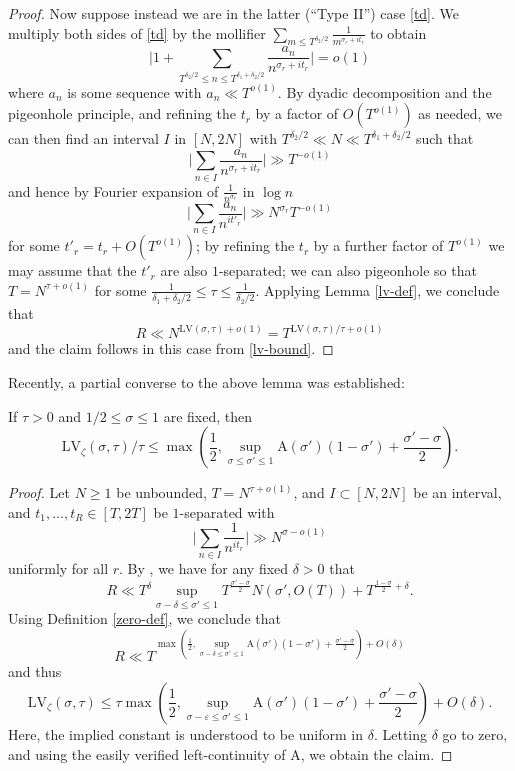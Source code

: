 \documentclass[a4paper, 10pt]{amsart}
\newcommand{\eps}{\varepsilon}
\newcommand{\LV}{\mathrm{LV}}
\newcommand{\A}{\mathrm{A}}
\begin{document}
\begin{proof}
    Now suppose instead we are in the latter (``Type II'') case \eqref{td}.  We multiply both sides of \eqref{td} by the mollifier $\sum_{m \leq T^{\delta_2/2}} \frac{1}{m^{\sigma_r+it_r}}$ to obtain
    $$ \bigg| 1 + \sum_{T^{\delta_2/2} \leq n \leq T^{\delta_1+\delta_2/2}} \frac{a_n}{n^{\sigma_r+it_r}} \bigg| = o(1)$$
    where $a_n$ is some sequence with $a_n \ll T^{o(1)}$.  By dyadic decomposition and the pigeonhole principle, and refining the $t_r$ by a factor of $O(T^{o(1)})$ as needed, we can then find an interval $I$ in $[N,2N]$ with $T^{\delta_2/2} \ll N \ll T^{\delta_1+\delta_2/2}$ such that
    $$ \bigg| \sum_{n \in I} \frac{a_n}{n^{\sigma_r+it_r}} \bigg| \gg T^{-o(1)}$$
    and hence by Fourier expansion of $\frac{1}{n^{\sigma_r}}$ in $\log n$
    $$ \bigg| \sum_{n \in I} \frac{a_n}{n^{it'_r}} \bigg| \gg N^{\sigma_r} T^{-o(1)}$$
    for some $t'_r = t_r + O(T^{o(1)})$; by refining the $t_r$ by a further factor of $T^{o(1)}$ we may assume that the $t'_r$ are also $1$-separated; we can also pigeonhole so that $T = N^{\tau+o(1)}$ for some $\frac{1}{\delta_1+\delta_2/2} \leq \tau \leq \frac{1}{\delta_2/2}$.  Applying Lemma \ref{lv-def}, we conclude that
    $$ R \ll N^{\LV(\sigma,\tau)+o(1)} = T^{\LV(\sigma,\tau)/\tau+o(1)}$$
    and the claim follows in this case from \eqref{lv-bound}.
    \end{proof}

    Recently, a partial converse to the above lemma was established:

    \begin{lemma}\label{zero-dens_implies_large}\cite[Theorem 1.2]{matomaki_teravainen_2024} If $\tau > 0$ and $1/2 \leq \sigma \leq 1$ are fixed, then
        $$ \LV_\zeta(\sigma,\tau)/\tau \leq \max\left( \frac{1}{2}, \sup_{\sigma \leq \sigma' \leq 1} \A(\sigma')(1-\sigma') + \frac{\sigma'-\sigma}{2} \right).$$
    \end{lemma}

    \begin{proof}  Let $N \geq 1$ be unbounded, $T = N^{\tau+o(1)}$, and $I \subset [N,2N]$ be an interval, and $t_1,\dots,t_R \in [T,2T]$ be $1$-separated with
    $$ \bigg| \sum_{n \in I} \frac{1}{n^{it_r}} \bigg| \gg N^{\sigma-o(1)}$$
    uniformly for all $r$.  By \cite[Theorem 1.2]{matomaki_teravainen_2024}, we have for any fixed $\delta>0$ that
    $$ R \ll T^\delta \sup_{\sigma-\delta \leq \sigma' \leq 1} T^{\frac{\sigma' - \sigma}{2}} N(\sigma', O(T)) + T^{\frac{1-\sigma}{2}+\delta}.$$
    Using Definition \ref{zero-def}, we conclude that
    $$ R \ll T^{\max( \frac{1}{2}, \sup_{\sigma-\delta \leq \sigma' \leq 1} \A(\sigma')(1-\sigma') + \frac{\sigma'-\sigma}{2} ) + O(\delta)}$$
    and thus
    $$ \LV_\zeta(\sigma,\tau) \leq \tau \max\left( \frac{1}{2}, \sup_{\sigma-\eps \leq \sigma' \leq 1} \A(\sigma')(1-\sigma') + \frac{\sigma'-\sigma}{2} \right) + O(\delta).$$
    Here, the implied constant  is understood to be uniform in $\delta$.
    Letting $\delta$ go to zero, and using the easily verified left-continuity of $\A$, we obtain the claim.
    \end{proof}
\end{document}
